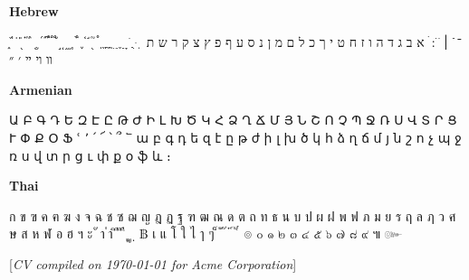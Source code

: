\documentclass[a4paper,10pt,oneside]{article}
\newcommand{\CVNote}{CV compiled on {\today} for Acme Corporation}
\begin{document}
\begin{body}
\EntryGap
\textbf{Hebrew}
\begin{detail}
֑ ֒ ֓ ֔ ֕ ֖ ֗ ֘ ֙ ֚ ֛ ֜ ֝ ֞ ֟ ֠ ֡ ֣ ֤ ֥ ֦ ֧ ֨ ֩ ֪ ֫ ֬ ֭ ֮ ֯ ְ ֱ ֲ ֳ ִ ֵ ֶ ַ ָ ֹ ֻ ּ ֽ ־ ֿ ׀ ׁ ׂ ׃ ׄ א ב ג ד ה ו ז ח ט י ך כ ל ם מ ן נ ס ע ף פ ץ צ ק ר ש ת װ ױ ײ ׳ ״
\end{detail}

\EntryGap
\textbf{Armenian}
\begin{detail}
\UseSecondaryFont
Ա Բ Գ Դ Ե Զ Է Ը Թ Ժ Ի Լ Խ Ծ Կ Հ Ձ Ղ Ճ Մ Յ Ն Շ Ո Չ Պ Ջ Ռ Ս Վ Տ Ր Ց Ւ Փ Ք Օ Ֆ ՙ ՚ ՛ ՜ ՝ ՞ ՟ ա բ գ դ ե զ է ը թ ժ ի լ խ ծ կ հ ձ ղ ճ մ յ ն շ ո չ պ ջ ռ ս վ տ ր ց ւ փ ք օ ֆ և ։
\end{detail}

\EntryGap
\textbf{Thai}
\begin{detail}
\UseSecondaryFont
ก ข ฃ ค ฅ ฆ ง จ ฉ ช ซ ฌ ญ ฎ ฏ ฐ ฑ ฒ ณ ด ต ถ ท ธ น บ ป ผ ฝ พ ฟ ภ ม ย ร ฤ ล ฦ ว ศ ษ ส ห ฬ อ ฮ ฯ ะ ั า ำ ิ ี ึ ื ุ ู ฺ ฿ เ แ โ ใ ไ ๅ ๆ ็ ่ ้ ๊ ๋ ์ ํ ๎ ๏ ๐ ๑ ๒ ๓ ๔ ๕ ๖ ๗ ๘ ๙ ๚ ๛
\end{detail}

\end{body}


\begin{flushright}
\scriptsize%
[\textit{\CVNote}]%
\hspace{2.0mm}\null
\end{flushright}

\label{LastPage}~
\end{document}

